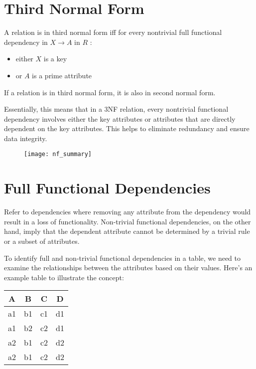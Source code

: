 \section{Third Normal Form}

A relation is in third normal form iff for every nontrivial full functional dependency in $X \rightarrow A$ in $R$ :
\begin{itemize}
    \item either $X$ is a key
    \item or $A$ is a prime attribute
\end{itemize}

If a relation is in third normal form, it is also in second normal form.

Essentially, this means that in a 3NF relation, every nontrivial functional dependency involves either the key attributes or attributes that are directly dependent on the key attributes. This helps to eliminate redundancy and ensure data integrity.

\begin{figure}[H]
    \centering
    \texttt{[image: nf\_summary]}
\end{figure}

\section{Full Functional Dependencies}

Refer to dependencies where removing any attribute from the dependency would result in a loss of functionality. Non-trivial functional dependencies, on the other hand, imply that the dependent attribute cannot be determined by a trivial rule or a subset of attributes.

To identify full and non-trivial functional dependencies in a table, we need to examine the relationships between the attributes based on their values. Here's an example table to illustrate the concept:

\begin{center}
\begin{tabular}{|c|c|c|c|}
\hline
A & B & C & D \\ 
\hline 
\hline
a1 & b1 & c1 & d1 \\ 
\hline 
a1 & b2 & c2 & d1 \\ 
\hline 
a2 & b1 & c2 & d2 \\ 
\hline 
a2 & b1 & c2 & d2 \\ 
\hline 
\end{tabular} 
\end{center}


